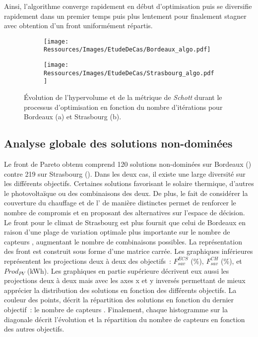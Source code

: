 Ainsi, l’algorithme converge rapidement en début d’optimisation puis se diversifie
rapidement dans un premier temps puis plus lentement pour finalement stagner avec obtention
d’un front uniformément répartis.

\begin{figure}
    \centering
    \begin{subfigure}[b]{0.48\textwidth}
        \centering
        \texttt{[image: Ressources/Images/EtudeDeCas/Bordeaux\_algo.pdf]}
        \caption{}
        \label{fig:hypervolume_schott_bor}
    \end{subfigure}
    \quad
    \begin{subfigure}[b]{0.48\textwidth}
        \centering
        \texttt{[image: Ressources/Images/EtudeDeCas/Strasbourg\_algo.pdf]}
        \caption{}
        \label{fig:hypervolume_schottstras}
    \end{subfigure}
    \caption[Évolution de la convergence et de la diversification de l’optimisation]
             {Évolution de l’hypervolume et de la métrique de \textit{Schott}
              durant le processus d’optimisation en fonction du nombre d’itérations pour
              Bordeaux (a) et Strasbourg (b).}
    \label{fig:hypervolume_schott_front}
\end{figure}



\subsection{Analyse globale des solutions non-dominées} %
\label{sub:analyse_globale_des_solutions_non_dominees}
Le front de Pareto obtenu comprend \num{120} solutions non-dominées sur Bordeaux
() contre \num{219} sur Strasbourg
(). Dans les deux cas, il existe une large diversité
sur les différents objectifs. Certaines solutions favorisant le solaire thermique,
d’autres le photovoltaïque ou des combinaisons des deux. De plus, le fait de considérer
la couverture du chauffage et de l’ de manière distinctes permet de renforcer le
nombre de compromis et en proposant des alternatives sur l’espace de décision. Le front pour le climat de
Strasbourg est plus fournit que celui de Bordeaux en raison d’une plage de variation
optimale plus importante sur le nombre de capteurs , augmentant le nombre de
combinaisons possibles.
La représentation des front est construit sous forme d’une matrice carrée.
Les graphiques inférieures représentent les projections deux à deux des objectifs~:
$F_{sav}^{ECS}$ (\si{\percent}), $F_{sav}^{CH}$ (\si{\percent}), et $Prod_{PV}$ (\si{kWh}).
Les graphiques en partie supérieure décrivent eux aussi les projections deux à deux mais
avec les axes x et y inversés permettant de mieux
apprécier la distribution des solutions en fonction des différents objectifs. La couleur des points,
décrit la répartition des solutions en fonction du dernier objectif~: le nombre de capteurs .
Finalement, chaque histogramme sur la diagonale décrit l’évolution et la répartition du
nombre de capteurs  en fonction des autres objectifs.

